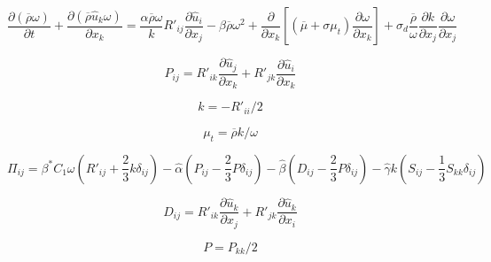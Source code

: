{\newpage\clearpage
{}%
\begin{displaymath}
\frac{\partial (\overline \rho \omega)}{\partial t} +
  \frac{\partial (\overline \rho \hat u_k \omega)}{\partial x_k}
  = \frac{\alpha \overline \rho \omega}{k} R'_{ij} \frac{\partial \hat u_i}{\partial x_j} -
  \beta \overline \rho \omega^2 + \frac{\partial}{\partial x_k}
  \left[ \left( \overline \mu + \sigma \mu_t \right)
  \frac{\partial \omega}{\partial x_k} \right] +
  \sigma_d \frac{\overline \rho}{\omega} \frac{\partial k}{\partial x_j}
  \frac{\partial \omega}{\partial x_j}
\end{displaymath}%
\lthtmldisplayZ
\lthtmlcheckvsize\clearpage}

{\newpage\clearpage
{}%
\begin{displaymath}
P_{ij} = R'_{ik}
\frac{\partial \hat u_j}{\partial x_k}
+ R'_{jk} \frac{\partial \hat u_i}{\partial x_k}
\end{displaymath}%
\lthtmldisplayZ
\lthtmlcheckvsize\clearpage}

{\newpage\clearpage
{}%
\begin{displaymath}
k=-R'_{ii}/2
\end{displaymath}%
\lthtmldisplayZ
\lthtmlcheckvsize\clearpage}

{\newpage\clearpage
{}%
\begin{displaymath}
\mu_t = \overline \rho k / \omega
\end{displaymath}%
\lthtmldisplayZ
\lthtmlcheckvsize\clearpage}

{\newpage\clearpage
{}%
\begin{displaymath}
\Pi_{ij} = \beta^* C_1 \omega \left( R'_{ij} +
  \frac{2}{3} k \delta_{ij} \right)
  - \hat \alpha \left( P_{ij} - \frac{2}{3} P \delta_{ij} \right)
  - \hat \beta \left( D_{ij} - \frac{2}{3} P \delta_{ij} \right)
  - \hat \gamma k \left( S_{ij} - \frac{1}{3} S_{kk} \delta_{ij} \right)
\end{displaymath}%
\lthtmldisplayZ
\lthtmlcheckvsize\clearpage}

{\newpage\clearpage
{}%
\begin{displaymath}
D_{ij} = R'_{ik}
\frac{\partial \hat u_k}{\partial x_j}
+ R'_{jk} \frac{\partial \hat u_k}{\partial x_i}
\end{displaymath}%
\lthtmldisplayZ
\lthtmlcheckvsize\clearpage}

{\newpage\clearpage
{}%
\begin{displaymath}
P = P_{kk}/2
\end{displaymath}%
\lthtmldisplayZ
\lthtmlcheckvsize\clearpage}


